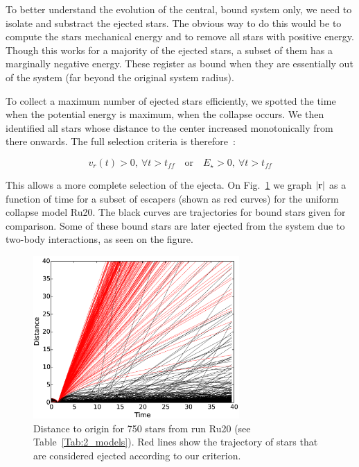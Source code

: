 To better understand the evolution of the central, bound system only, we need to isolate and substract the ejected stars. The obvious way to do this would be to compute the stars mechanical energy and to remove all stars with positive energy. Though this works for a majority of the ejected stars, a subset of them has a marginally negative energy. These register as bound when they are essentially out of the system (far beyond the original system radius). 

To collect a maximum number of ejected stars efficiently, we spotted the time when the potential energy is maximum, when the collapse occurs. We  then identified all stars whose distance to the center increased monotonically from there onwards. The full selection criteria is therefore~:

\begin{equation}
v_r(t) > 0,~\forall t > t_{ff}\quad \textrm{or} \quad  E_\star > 0 , ~\forall t > t_{ff}
\end{equation}
 
This allows a more complete selection of the ejecta.  On Fig.~\ref{Fig:3_DistOrigin} we graph  $|\bold{r}|$  as a function of time for a subset of escapers (shown as red curves) for the uniform collapse model Ru20. The black curves are trajectories for bound stars given for comparison. Some of these bound stars are later ejected from the system due to two-body interactions, as seen on the figure.

\begin{figure}
\begin{center}
\includegraphics[width=0.7\textwidth]{Figures/3_DistOrigin}
\caption{Distance to origin for 750 stars from run Ru20 (see Table~\ref{Tab:2_models}). Red lines show the trajectory of stars that are considered ejected according to our criterion.}
\label{Fig:3_DistOrigin}
\end{center}
\end{figure}



